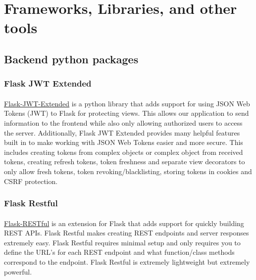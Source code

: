 \documentclass[12pt]{article}
\begin{document}
\pagebreak
\section{Frameworks, Libraries, and other tools}

\subsection{Backend python packages}
\subsubsection{Flask JWT Extended}
\paragraph{}
	\href{https://flask-jwt-extended.readthedocs.io/en/latest/}{Flask-JWT-Extended} is a python library that adds support for using JSON Web Tokens (JWT) to Flask for protecting views. This allows our application to send information to the frontend while also only allowing authorized users to access the server. Additionally, Flask JWT Extended provides many helpful features built in to make working with JSON Web Tokens easier and more secure. This includes creating tokens from complex objects or complex object from received tokens, creating refresh tokens, token freshness and separate view decorators to only allow fresh tokens, token revoking/blacklisting, storing tokens in cookies and CSRF protection.


\subsubsection{Flask Restful}	
\paragraph{}
	\href{https://flask-restful.readthedocs.io/en/latest/}{Flask-RESTful} is an extension for Flask that adds support for quickly building REST APIs. Flask Restful makes creating REST endpoints and server responses extremely easy. Flask Restful requires minimal setup and only requires you to define the URL's for each REST endpoint and what function/class methods correspond to the endpoint. Flask Restful is extremely lightweight but extremely powerful.
	
\end{document}
